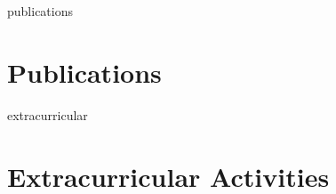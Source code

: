 \documentclass[12pt]{report} %
\begin{document}
\ifcsname publications\endcsname%
\section{Publications}
\publications{}
\fi



\iffalse
\ifcsname presentations\endcsname%
\section{Presentations}
\presentations{}
\fi
\fi



\iffalse
\ifcsname awards\endcsname%
\section{Awards}
\awards{}
\fi
\fi



\ifcsname extracurricular\endcsname%
\section{Extracurricular Activities}
\extracurricular{}
\fi



\iffalse
\ifcsname languages\endcsname%
\section{Languages}
\languages{}
\fi
\fi


\end{document}
